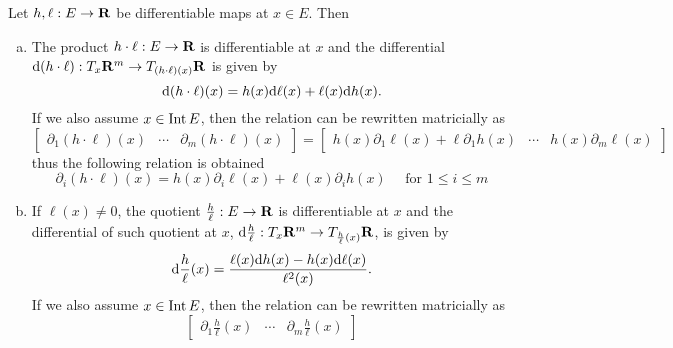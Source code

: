 \begin{theorem}\label{thm: diff-prod-div}
    Let \(h, \ell: E \to \mathbf{R}\) be differentiable maps at \(x \in E\). Then
    \begin{enumerate}[(a)]
        \item The product \(h \cdot \ell: E \to \mathbf{R}\) is differentiable at \(x\) and
              the differential \(\mathrm{d}(h \cdot \ell): T_x\mathbf{R}^m \to T_{(h \cdot
                      \ell)(x)}\mathbf{R}\) is given by
              \begin{equation}
                  \mathrm{d}(h \cdot \ell)(x) = h(x) \mathrm{d} \ell(x) + \ell(x) \mathrm{d} h(x).
              \end{equation}
              If we also assume \(x \in \operatorname{Int} E\), then the relation can be rewritten
              matricially as
              \[
                  \begin{bmatrix}
                      \partial_1 (h \cdot \ell)(x) & \cdots & \partial_m (h \cdot \ell)(x)
                  \end{bmatrix}
                  =
                  \begin{bmatrix}
                      h(x) \partial_1 \ell(x) + \ell \partial_1 h(x)
                       & \cdots
                       & h(x) \partial_m \ell(x)
                  \end{bmatrix}
              \]
              thus the following relation is obtained
              \begin{equation}
                  \partial_i (h \cdot \ell)(x) =
                  h(x) \partial_i \ell(x) + \ell(x) \partial_i h(x)
                  \quad \text{ for } 1 \leq i \leq m
              \end{equation}
        \item If \(\ell(x) \neq 0\), the quotient \(\frac h \ell: E \to \mathbf{R}\) is
              differentiable at \(x\) and the differential of such quotient at \(x\),
              \(\mathrm{d} \frac h \ell: T_x\mathbf{R}^m \to T_{\frac h \ell (x)}\mathbf{R}\), is given by
              \begin{equation}
                  \mathrm{d} \frac h \ell (x) =
                  \frac{\ell(x) \mathrm{d} h(x) - h(x) \mathrm{d} \ell(x)}{\ell^2(x)}.
              \end{equation}
              If we also assume \(x \in \operatorname{Int} E\), then the relation can be rewritten
              matricially as
                  {\small%
                      \[
                          \begin{bmatrix}
                              \partial_1 \frac h \ell (x) & \cdots & \partial_m \frac h \ell (x)

\end{bmatrix}\]}
\end{enumerate}
\end{theorem}
